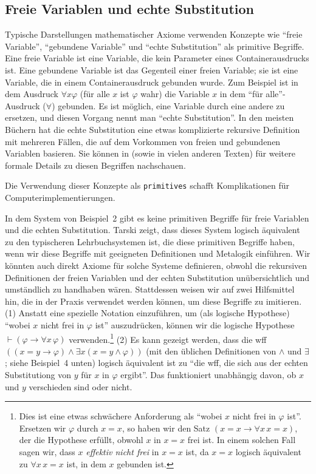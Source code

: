 \subsection{Freie Variablen und echte Substitution}

Typische Darstellungen mathematischer Axiome verwenden Konzepte wie "`freie Variable"', "`gebundene Variable"' und "`echte Substitution"' als primitive Begriffe. Eine freie Variable ist eine Variable, die kein Parameter eines Containerausdrucks ist. Eine gebundene Variable ist das Gegenteil einer freien Variable; sie ist eine Variable, die in einem Containerausdruck gebunden wurde. Zum Beispiel ist in dem Ausdruck $\forall x \varphi$ (für alle $x$ ist $\varphi$ wahr) die Variable $x$ in dem "`für alle"'-Ausdruck ($\forall$) gebunden. Es ist möglich, eine Variable durch eine andere zu ersetzen, und diesen Vorgang nennt man "`echte Substitution"'. In den meisten Büchern hat die echte Substitution eine etwas komplizierte rekursive Definition mit mehreren Fällen, die auf dem Vorkommen von freien und gebundenen Variablen basieren.
Sie können in \cite[ch.\ 3--4]{Hamilton} (sowie in vielen anderen Texten) für weitere formale Details zu diesen Begriffen nachschauen. 

Die Verwendung dieser Konzepte als \texttt{primitives} schafft Komplikationen für Computerimplementierungen. 

In dem System von Beispiel~2 gibt es keine primitiven Begriffe für freie Variablen und die echten Substitution.  Tarski \cite{Tarski1965} zeigt, dass dieses System logisch äquivalent zu den typischeren Lehrbuchsystemen ist, die diese primitiven Begriffe haben, wenn wir diese Begriffe mit geeigneten Definitionen und Metalogik einführen.  Wir könnten auch direkt Axiome für solche Systeme definieren, obwohl die rekursiven Definitionen der freien Variablen und der echten Substitution unübersichtlich und umständlich zu handhaben wären.  Stattdessen weisen wir auf zwei Hilfsmittel hin, die in der Praxis verwendet werden können, um diese Begriffe zu imitieren.  (1) Anstatt eine spezielle Notation einzuführen, um (als logische Hypothese) "`wobei $x$ nicht frei in $\varphi$ ist"' auszudrücken, können wir die logische Hypothese $\vdash(\varphi\to\forall x\,\varphi)$ verwenden.\label{effectivelybound}\footnote{Dies ist eine etwas schwächere Anforderung als "`wobei $x$ nicht frei in $\varphi$ ist"'.  Ersetzen wir $\varphi$ durch $x=x$, so haben wir den Satz $(x=x\to\forall x\,x=x)$, der die Hypothese erfüllt, obwohl $x$ in $x=x$ frei ist. In einem solchen Fall sagen wir, dass $x$ {\em effektiv nicht frei} in $x=x$ ist, da $x=x$ logisch äquivalent zu $\forall x\,x=x$ ist, in dem $x$ gebunden ist.} (2) Es kann gezeigt werden, dass die wff $((x=y\to\varphi)\wedge\exists x(x=y\wedge\varphi))$ (mit den üblichen Definitionen von $\wedge$ und $\exists$; siehe Beispiel~4 unten) logisch äquivalent ist zu "`die wff, die sich aus der echten Substitutiong von $y$ für $x$ in $\varphi$ ergibt"'.  Das funktioniert unabhängig davon, ob $x$ und $y$ verschieden sind oder nicht. 

